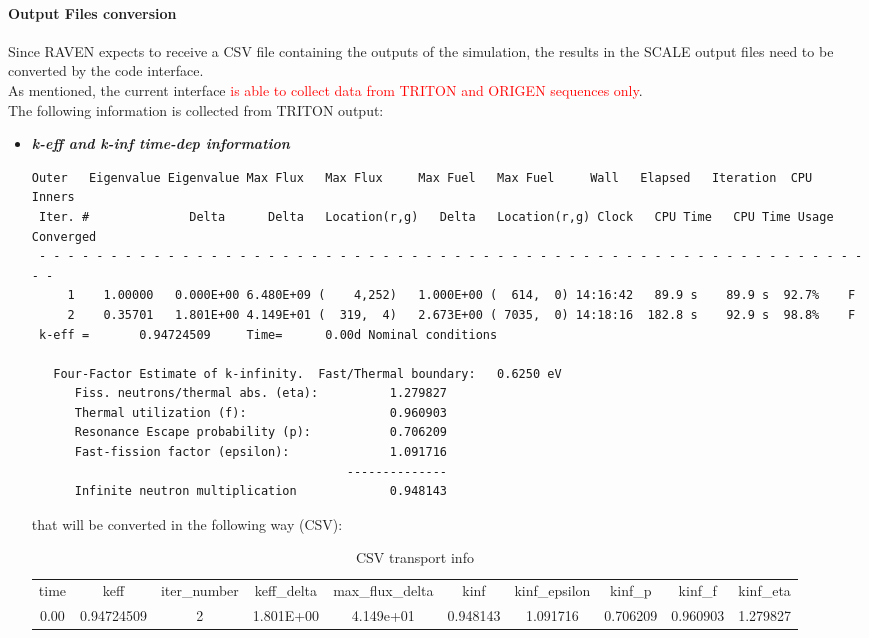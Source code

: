 \paragraph{Output Files conversion}
Since RAVEN expects to receive a CSV file containing the outputs of the simulation, the results in the SCALE output
files need to be converted by the code interface.
\\As mentioned, the current interface \textcolor{red}{ is able to collect data from TRITON and ORIGEN sequences only}.
\\The following information is collected from TRITON output:
\begin{itemize}
  \item \textit{\textbf{k-eff and k-inf time-dep information}}
  \begin{lstlisting}[basicstyle=\tiny]
  Outer   Eigenvalue Eigenvalue Max Flux   Max Flux     Max Fuel   Max Fuel     Wall   Elapsed   Iteration  CPU   Inners
 Iter. #              Delta      Delta   Location(r,g)   Delta   Location(r,g) Clock   CPU Time   CPU Time Usage Converged
 - - - - - - - - - - - - - - - - - - - - - - - - - - - - - - - - - - - - - - - - - - - - - - - - - - - - - - - - - - - -
     1    1.00000   0.000E+00 6.480E+09 (    4,252)   1.000E+00 (  614,  0) 14:16:42   89.9 s    89.9 s  92.7%    F
     2    0.35701   1.801E+00 4.149E+01 (  319,  4)   2.673E+00 ( 7035,  0) 14:18:16  182.8 s    92.9 s  98.8%    F
 k-eff =       0.94724509     Time=      0.00d Nominal conditions

   Four-Factor Estimate of k-infinity.  Fast/Thermal boundary:   0.6250 eV
      Fiss. neutrons/thermal abs. (eta):          1.279827
      Thermal utilization (f):                    0.960903
      Resonance Escape probability (p):           0.706209
      Fast-fission factor (epsilon):              1.091716
                                            --------------
      Infinite neutron multiplication             0.948143

\end{lstlisting}
   that will be converted in the following way (CSV):
   \begin{table}[h]
    \centering
    \caption{CSV transport info}
    \label{CSVkeff}
    \tabcolsep=0.11cm
    \tiny
    \begin{tabular}{|c|c|c|c|c|c|c|c|c|c|}
     time & keff       & iter\_number & keff\_delta & max\_flux\_delta & kinf     & kinf\_epsilon & kinf\_p  & kinf\_f  & kinf\_eta \\
     0.00 & 0.94724509 & 2            & 1.801E+00   & 4.149e+01        & 0.948143 & 1.091716      & 0.706209 & 0.960903 & 1.279827
    \end{tabular}
   \end{table}


\end{itemize}
